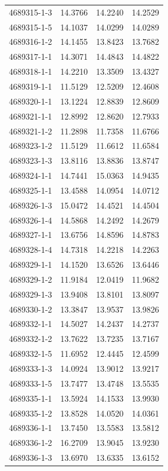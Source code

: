 \begin{longtable}{lrrr}
4689315-1-3 & 14.3766 & 14.2240 & 14.2529 \\
4689315-1-5 & 14.1037 & 14.0299 & 14.0289 \\
4689316-1-2 & 14.1455 & 13.8423 & 13.7682 \\
4689317-1-1 & 14.3071 & 14.4843 & 14.4822 \\
4689318-1-1 & 14.2210 & 13.3509 & 13.4327 \\
4689319-1-1 & 11.5129 & 12.5209 & 12.4608 \\
4689320-1-1 & 13.1224 & 12.8839 & 12.8609 \\
4689321-1-1 & 12.8992 & 12.8620 & 12.7933 \\
4689321-1-2 & 11.2898 & 11.7358 & 11.6766 \\
4689323-1-2 & 11.5129 & 11.6612 & 11.6584 \\
4689323-1-3 & 13.8116 & 13.8836 & 13.8747 \\
4689324-1-1 & 14.7441 & 15.0363 & 14.9435 \\
4689325-1-1 & 13.4588 & 14.0954 & 14.0712 \\
4689326-1-3 & 15.0472 & 14.4521 & 14.4504 \\
4689326-1-4 & 14.5868 & 14.2492 & 14.2679 \\
4689327-1-1 & 13.6756 & 14.8596 & 14.8783 \\
4689328-1-4 & 14.7318 & 14.2218 & 14.2263 \\
4689329-1-1 & 14.1520 & 13.6526 & 13.6446 \\
4689329-1-2 & 11.9184 & 12.0419 & 11.9682 \\
4689329-1-3 & 13.9408 & 13.8101 & 13.8097 \\
4689330-1-2 & 13.3847 & 13.9537 & 13.9826 \\
4689332-1-1 & 14.5027 & 14.2437 & 14.2737 \\
4689332-1-2 & 13.7622 & 13.7235 & 13.7167 \\
4689332-1-5 & 11.6952 & 12.4445 & 12.4599 \\
4689333-1-3 & 14.0924 & 13.9012 & 13.9217 \\
4689333-1-5 & 13.7477 & 13.4748 & 13.5535 \\
4689335-1-1 & 13.5924 & 14.1533 & 13.9930 \\
4689335-1-2 & 13.8528 & 14.0520 & 14.0361 \\
4689336-1-1 & 13.7450 & 13.5583 & 13.5812 \\
4689336-1-2 & 16.2709 & 13.9045 & 13.9230 \\
4689336-1-3 & 13.6970 & 13.6335 & 13.6152 \\

\end{longtable}
